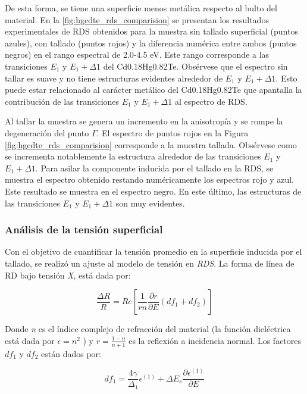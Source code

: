 De esta forma, se tiene una superficie menos metálica respecto al bulto del material. En la 
\ref{fig:hgcdte_rds_comparision} se presentan los resultados experimentales de RDS obtenidos para la muestra sin 
tallado superficial (puntos azules), con tallado (puntos rojos) y la diferencia numérica entre ambos (puntos negros) 
en el rango espectral de 2.0-4.5 eV. 
Este rango corresponde a las transiciones $E_{1}$ y $E_{1}+\Delta1$ del Cd0.18Hg0.82Te\cite{Camacho2005}. Obsérvese que 
el espectro sin tallar es suave y no tiene estructuras evidentes alrededor de $E_{1}$ y $E_{1}+\Delta1$. Esto puede 
estar relacionado al carácter metálico del Cd0.18Hg0.82Te que apantalla la contribución de las transiciones 
$E_{1}$ y $E_{1}+\Delta1$ al espectro de RDS. 

Al tallar la muestra se genera un incremento en la anisotropía y se rompe la degeneración del punto $\Gamma$. El 
espectro de puntos rojos en la Figura \ref{fig:hgcdte_rds_comparision} corresponde a la muestra tallada. Obsérvese 
como se incrementa notablemente la estructura alrededor de   las transiciones $E_{1}$ y $E_{1}+\Delta1$. Para asilar 
la componente inducida por el tallado en la RDS, se muestra el espectro obtenido restando numéricamente los espectros 
rojo y azul. Este resultado se muestra en el espectro negro. En este último, las estructuras de las transiciones 
$E_{1}$ y $E_{1}+\Delta1$ son muy evidentes.

\subsubsection{Análisis de la tensión superficial}
\label{sec:chap4-hgcdte-rds-stress}
Con el objetivo de cuantificar la tensión promedio en la superficie inducida por el tallado, 
se realizó un ajuste al modelo de tensión en \textit{RDS}. La forma de línea de RD bajo tensión \textit{X}, está dada 
por\cite{LastrasMartnez2010}:

\begin{equation}
    \frac{\Delta R}{R} = Re [\frac{1}{r n}\frac{\partial r}{\partial E} (df_{1} + df_{2})]
\end{equation}

Donde \textit{n} es el índice complejo de refracción del material (la función dieléctrica está dada por 
$ \epsilon = n^{2}$ ) y $ r=\frac{1-n}{n+1} $ es la reflexión a incidencia normal. 
Los factores $df_{1}$ y $df_{2}$ están dados por:

\begin{equation}
    df_{1} = \frac{4\gamma}{\Delta_{1}} \epsilon^{(1)} +  \Delta E_{s}\frac{\partial \epsilon^{(1)}}{\partial E}
\end{equation}

